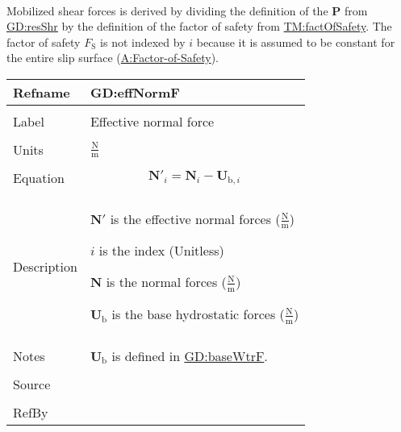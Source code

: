 \documentclass[12pt]{article}
\begin{document}
\paragraph{}
\label{GD:mobShrDeriv}
Mobilized shear forces is derived by dividing the definition of the $\symbf{P}$ from \hyperref[GD:resShr]{GD:resShr} by the definition of the factor of safety from \hyperref[TM:factOfSafety]{TM:factOfSafety}. The factor of safety ${F_{\text{S}}}$ is not indexed by $i$ because it is assumed to be constant for the entire slip surface (\hyperref[assumpFOS]{A:Factor-of-Safety}).

\vspace{\baselineskip}
\noindent
\begin{minipage}{\textwidth}
\begin{tabular}{>{\raggedright}p{}>{\raggedright\arraybackslash}p{}}
\toprule \textbf{Refname} & \textbf{GD:effNormF}
\label{GD:effNormF}
\\ \midrule \\
Label & Effective normal force
        
\\ \midrule \\
Units & $\frac{\text{N}}{\text{m}}$
        
\\ \midrule \\
Equation & \begin{displaymath}
           {\symbf{N'}}_{i}={\symbf{N}}_{i}-{\symbf{U}_{\text{b},i}}
           \end{displaymath}
\\ \midrule \\
Description & \begin{symbDescription}
              \item{$\symbf{N'}$ is the effective normal forces ($\frac{\text{N}}{\text{m}}$)}
              \item{$i$ is the index (Unitless)}
              \item{$\symbf{N}$ is the normal forces ($\frac{\text{N}}{\text{m}}$)}
              \item{${\symbf{U}_{\text{b}}}$ is the base hydrostatic forces ($\frac{\text{N}}{\text{m}}$)}
              \end{symbDescription}
\\ \midrule \\
Notes & ${\symbf{U}_{\text{b}}}$ is defined in \hyperref[GD:baseWtrF]{GD:baseWtrF}.
        
\\ \midrule \\
Source & \cite{chen2005}
         
\\ \midrule \\
RefBy & 
\\ \bottomrule
\end{tabular}
\end{minipage}
\end{document}

